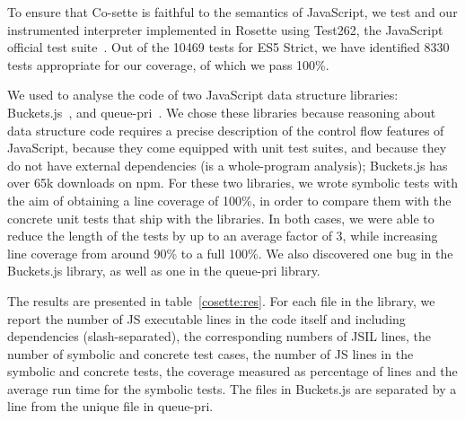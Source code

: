 
To ensure that Co-sette is faithful to the semantics of JavaScript, we test \JSComp and our instrumented \jsil interpreter implemented in Rosette using Test262, the JavaScript official test suite~\cite{test262}. 
Out of the 10469 tests for ES5 Strict, we have identified 8330 tests appropriate for our coverage, of which we pass 100\%.




We used \cosette to analyse the code of two JavaScript data structure libraries: Buckets.js~\cite{buckets}, and queue-pri~\cite{priq}.
We chose these libraries because reasoning about data structure code requires a precise description of the control flow features of JavaScript, because they come equipped with unit test suites, and because they do not have external dependencies (\cosette is a whole-program analysis); Buckets.js has over 65k downloads on npm.
For these two libraries, we wrote symbolic tests with the aim of obtaining a line coverage of 100\%, in order to compare them with the concrete unit tests that ship with the libraries.
In both cases, we were able to reduce the length of the tests by up to an average factor of 3, while increasing line coverage from around 90\% to a full 100\%.
We also discovered one bug in the Buckets.js library, as well as one in the queue-pri library.


The results are presented in table~\ref{cosette:res}.
For each file in the library, we report the number of JS executable lines in the code itself and including dependencies (slash-separated), the corresponding numbers of JSIL lines, the number of symbolic and concrete test cases, the number of JS lines in the symbolic and concrete tests, the coverage measured as percentage of lines and the average \cosette run time for the symbolic tests.
The files in Buckets.js are separated by a line from the unique file in queue-pri.

